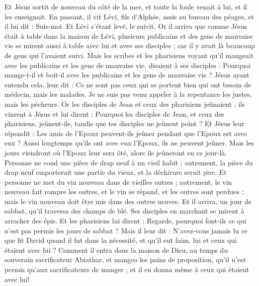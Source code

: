 \begin{multicols}{2}
Et Jésus sortit de nouveau du côté de la mer, et toute la foule venait à lui, et il les enseignait.
En passant, il vit Lévi, fils d'Alphée, assis au bureau des péages, et il lui dit : Suis-moi. Et Lévi s'étant levé, le suivit.
Or il arriva que comme Jésus était à table dans la maison de Lévi, plusieurs publicains et des gens de mauvaise vie se mirent aussi à table avec lui et avec ses disciples ; car il y avait là beaucoup de gens qui l'avaient suivi.
Mais les scribes et les pharisiens voyant qu'il mangeait avec les publicains et les gens de mauvaise vie, disaient à ses disciples : Pourquoi mange-t-il et boit-il avec les publicains et les gens de mauvaise vie ?
Jésus ayant entendu cela, leur dit : Ce ne sont pas ceux qui se portent bien qui ont besoin de médecin, mais les malades. Je ne suis pas venu appeler à la repentance les justes, mais les pécheurs.
Or les disciples de Jean et ceux des pharisiens jeûnaient ; ils vinrent à Jésus et lui dirent : Pourquoi les disciples de Jean, et ceux des pharisiens, jeûnent-ils, tandis que tes disciples ne jeûnent point ?
Et Jésus leur répondit : Les amis de l'Epoux peuvent-ils jeûner pendant que l'Epoux est avec eux ? Aussi longtemps qu’ils ont avec eux l'Epoux, ils ne peuvent jeûner.
Mais les jours viendront où l'Epoux leur sera ôté, alors ils jeûneront en ce jour-là.
Personne ne coud une pièce de drap neuf à un vieil habit ; autrement, la pièce du drap neuf emporterait une partie du vieux, et la déchirure serait pire.
Et personne ne met du vin nouveau dans de vieilles outres ; autrement, le vin nouveau fait rompre les outres, et le vin se répand, et les outres sont perdues ; mais le vin nouveau doit être mis dans des outres neuves.
Et il arriva, un jour de sabbat, qu'il traversa des champs de blé. Ses disciples en marchant se mirent à arracher des épis.
Et les pharisiens lui dirent : Regarde, pourquoi font-ils ce qui n'est pas permis les jours de sabbat ?
Mais il leur dit : N'avez-vous jamais lu ce que fit David quand il fut dans la nécessité, et qu'il eut faim, lui et ceux qui étaient avec lui ?
Comment il entra dans la maison de Dieu, au temps du souverain sacrificateur Abiathar, et mangea les pains de proposition, qu’il n'est permis qu'aux sacrificateurs de manger ; et il en donna même à ceux qui étaient avec lui!

\end{multicols}
